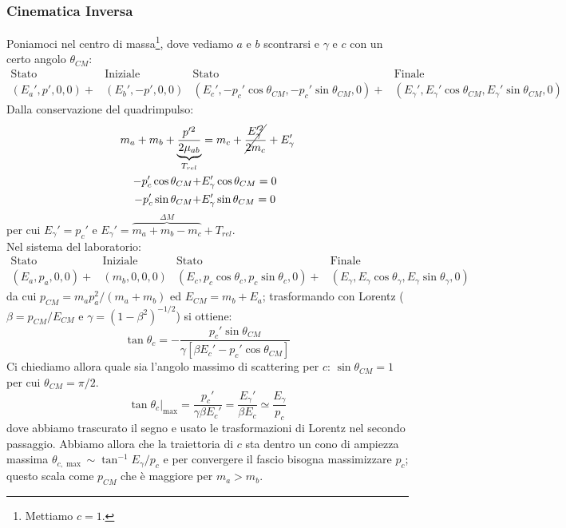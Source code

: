 \subsubsection{Cinematica Inversa} 
Poniamoci nel centro di massa\footnote{Mettiamo $c=1$.}, dove vediamo $a$ e $b$ scontrarsi e $\gamma$ e $c$  con un certo angolo $\theta_{CM}$:
\begin{align*}
	\text{Stato  }&\text{Iniziale} & \text{Stato  }&\text{Finale} \\
	(E_a',p',0,0) +&(E_b',-p',0,0) & (E_c',-p_c'\cos{\theta_{CM}},-p_c'\sin{\theta_{CM},0}) +&(E_\gamma',E_\gamma'\cos{\theta_{CM}},E_\gamma'\sin{\theta_{CM}},0) 
\end{align*}
Dalla conservazione del quadrimpulso:
\begin{align*}
	m_a+m_b + \underbrace{\frac{p'^{2}}{2\mu_{ab}}}_{T_{rel}} &= m_c + \cancel{\frac{E_\gamma'^2}{2m_c}}+E_\gamma' \\ 
	-p_c'\cos{\theta_{CM}} +& E_\gamma' \cos{\theta_{CM}} = 0\\
	-p_c'\sin{\theta_{CM}} +& E_\gamma' \sin{\theta_{CM}} = 0
\end{align*}
per cui $E_\gamma' = p_c'$ e $E_\gamma' = \overbrace{m_a+m_b-m_c}^{\Delta M} + T_{rel}$.\\ 
Nel sistema del laboratorio:
\begin{align*}
	\text{Stato  }&\text{Iniziale} & \text{Stato  }&\text{Finale} \\
	(E_a,p_a,0,0) +&(m_b,0,0,0) & (E_c,p_c\cos{\theta_{c}},p_c\sin{\theta_{c},0}) +&(E_\gamma,E_\gamma\cos{\theta_{\gamma}},E_\gamma\sin{\theta_{\gamma}},0) 
\end{align*}
da cui $p_{CM} = m_a p_a^2/(m_{a}+m_b)$ ed $E_{CM} = m_b + E_a$; trasformando con Lorentz ($\beta = p_{CM}/E_{CM}$ e $\gamma = (1-\beta^2)^{-1/2}$) si ottiene:
$$\tan{\theta_c} = -\frac{p_c' \sin{\theta_{CM}}}{\gamma [\beta E_c' -p_c'\cos{\theta_{CM}}]}$$
Ci chiediamo allora quale sia l'angolo massimo di scattering per $c$: $\sin{\theta_{CM}}=1$ per cui $\theta_{CM} = \pi/2$.
$$\tan{\theta_c}|_{\max{}} = \frac{p_c'}{\gamma\beta E_c'} = \frac{E_\gamma'}{\beta E_c}\simeq \frac{E_\gamma}{p_c} $$
dove abbiamo trascurato il segno e usato le trasformazioni di Lorentz nel secondo passaggio. Abbiamo allora che la traiettoria di $c$ sta dentro un cono di ampiezza massima $\theta_{c,\max{}} \sim \tan^{-1}{E_\gamma/p_c}$ e per convergere il fascio bisogna massimizzare $p_c$; questo scala come $p_{CM}$ che è maggiore per $m_a>m_b$.\\
